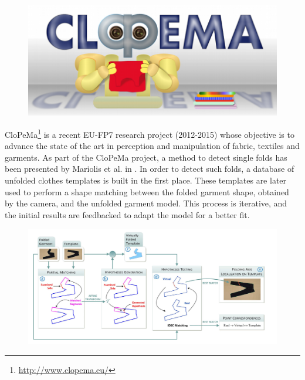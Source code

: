 \section{}

\begin{figure}[thpb]
    \centering
    \includegraphics[width=0.7
    \textwidth]{figures/SOTA_CloPeMa_logo.png}
    \caption{}
    \label{fig:SOTA_Stria_2014}
\end{figure}

CloPeMa\footnote{\url{http://www.clopema.eu/}} is a recent EU-FP7 research project (2012-2015) whose objective is to advance the state of the art in perception and manipulation of fabric, textiles and garments. As part of the CloPeMa project, a method to detect single folds has been presented by Mariolis et al. in \cite{Mariolis2013, Mariolis2015}. In order to detect such folds, a database of unfolded clothes templates is built in the first place. These templates are later used to perform a shape matching between the folded garment shape, obtained by the camera, and the unfolded garment model. This process is iterative, and the initial results are feedbacked to adapt the model for a better fit. 

\begin{figure}[thpb]
    \centering
    \includegraphics[width=\textwidth]{figures/SOTA_Mariolis_2015.png}
    \caption{}
    \label{fig:SOTA_Mariolis_2015}
\end{figure}

